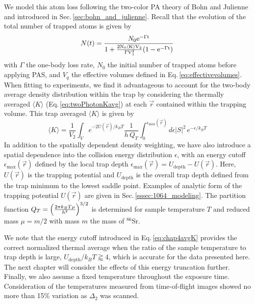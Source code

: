 We model this atom loss following the two-color PA theory of Bohn and Julienne and introduced in Sec.\,\ref{sec:bohn_and_julienne}.
Recall that the evolution of the total number of trapped atoms is given by
\begin{equation} \label{eq:4num}
   N(t)={N_0 \rm{e}^{-\Gamma t} \over 1+
   {2 N_0 \langle K \rangle V_2\over \Gamma V_1^2}(1-\rm{e}^{-\Gamma t})}
\end{equation}
with $\Gamma$ the one-body loss rate, $N_0$ the initial number of trapped atoms before applying PAS, and $V_q$ the effective volumes defined in Eq.\,\ref{eq:effectivevolumes}.
When fitting to experiments, we find it advantageous to account for the two-body average density distribution within the trap by considering the thermally averaged $\langle K \rangle$ (Eq.\,\ref{eq:twoPhotonKavg}) at each $\vec{r}$ contained within the trapping volume.
This trap averaged $\langle K \rangle$ is given by
\begin{equation} \label{eq:chap4avgK}
	\langle K \rangle = \frac{1}{V_2} \int_V e^{-2 U(\vec{r})/k_{B}T} \frac{1}{h\,Q_{T}} \int_{0}^{\epsilon_{\text{max}}(\vec{r})} d\epsilon \vert S \vert^2 \,e^{-\epsilon/k_{B}T}
\end{equation}
In addition to the spatially dependent density weighting, we have also introduce a spatial dependence into the collision energy distribution $\epsilon$, with an energy cutoff $\epsilon_{\text{max}}(\vec{r})$ defined by the local trap depth $\epsilon_{\text{max}}(\vec{r}) = U_{\text{depth}} - U(\vec{r})$.
Here, $U(\vec{r})$ is the trapping potential and $U_{\text{depth}}$ is the overall trap depth defined from the trap minimum to the lowest saddle point.
Examples of analytic form of the trapping potential $U(\vec{r})$ are given in Sec.\,\ref{sssec:1064_modeling}.
The partition function $Q_{T}=\left({2\pi k_{B}T \mu \over h^2}\right) ^{3/2}$ is determined for sample temperature $T$ and reduced mass $\mu = m/2$ with mass $m$ the mass of $^{86}$Sr.

We note that the energy cutoff introduced in Eq.\,\ref{eq:chap4avgK} provides the correct normalized thermal average when the ratio of the sample temperature to trap depth is large, $U_{\text{depth}} / k_B T \gtrapprox 4$, which is accurate for the data presented here.
The next chapter will consider the effects of this energy truncation further.
Finally, we also assume a fixed temperature throughout the exposure time.
Consideration of the temperatures measured from time-of-flight images showed no more than 15\% variation as $\Delta_2$ was scanned.

